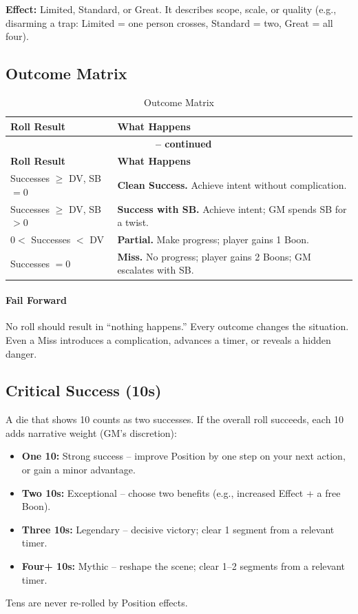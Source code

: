 \noindent \textbf{Effect:} Limited, Standard, or Great. It describes scope,
scale, or quality (e.g., disarming a trap: Limited = one person crosses,
Standard = two, Great = all four).

\subsection{Outcome Matrix}\label{subsec:outcome_matrix}

\begin{longtable}{p{2.5cm} p{10cm}}
\caption{Outcome Matrix}\label{tab:outcome_matrix}\\
\toprule
\textbf{Roll Result} & \textbf{What Happens} \\
\midrule
\endfirsthead
\multicolumn{2}{c}{{\bfseries \tablename\ \thetable{} -- continued}} \\
\toprule
\textbf{Roll Result} & \textbf{What Happens} \\
\midrule
\endhead
\bottomrule
\endfoot
Successes $\geq$ DV, SB $=0$ & \textbf{Clean Success.} Achieve intent without complication. \\
Successes $\geq$ DV, SB $>0$ & \textbf{Success with SB.} Achieve intent; GM spends SB for a twist. \\
$0 <$ Successes $<$ DV & \textbf{Partial.} Make progress; player gains 1 Boon. \\
Successes $=0$ & \textbf{Miss.} No progress; player gains 2 Boons; GM escalates with SB. \\
\end{longtable}

\paragraph{Fail Forward}
No roll should result in ``nothing happens.'' Every outcome changes the situation.
Even a Miss introduces a complication, advances a timer, or reveals a hidden danger.

\subsection{Critical Success (10s)}\label{subsec:critical_success}

A die that shows 10 counts as two successes. If the overall roll succeeds, each
10 adds narrative weight (GM's discretion):
\begin{itemize}
    \item \textbf{One 10:} Strong success -- improve Position by one step on your
        next action, or gain a minor advantage.
    \item \textbf{Two 10s:} Exceptional -- choose two benefits (e.g., increased
        Effect + a free Boon).
    \item \textbf{Three 10s:} Legendary -- decisive victory; clear 1 segment from
        a relevant timer.
    \item \textbf{Four+ 10s:} Mythic -- reshape the scene; clear 1--2 segments
        from a relevant timer.
\end{itemize}
\noindent Tens are never re-rolled by Position effects.

